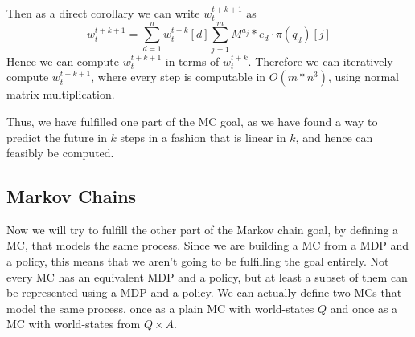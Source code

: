 \documentclass{article}
\theoremstyle{definition}
\def\mc{Markov chain}
\begin{document}
Then as a direct corollary we can write $w_t^{t+k+1}$ as 
\[
w_t^{t+k+1}=\sum\limits_{d=1}^{n} w_t^{t+k}[d] \sum\limits_{j=1}^{m} M^{a_j}*e_d\cdot \pi(q_d)[j]
\]
Hence we can compute $w_t^{t+k+1}$ in terms of $w_t^{t+k}$. Therefore we can iteratively compute $w_t^{t+k+1}$, where every step is computable in $O(m*n^3)$, using normal matrix multiplication. 

Thus, we have fulfilled one part of the MC goal, as we have found a way to predict the future in $k$ steps in a fashion that is linear in $k$, and hence can feasibly be computed. 

\subsection{Markov Chains}
Now we will try to fulfill the other part of the {\mc} goal, by defining a MC, that models the same process. Since we are building a MC from a MDP and a policy, this means that we aren't going to be fulfilling the goal entirely. Not every MC has an equivalent MDP and a policy, but at least a subset of them can be represented using a MDP and a policy. We can actually define two MCs that model the same process, once as a plain MC with world-states $Q$ and once as a MC with world-states from $Q\times A$. 
\end{document}

